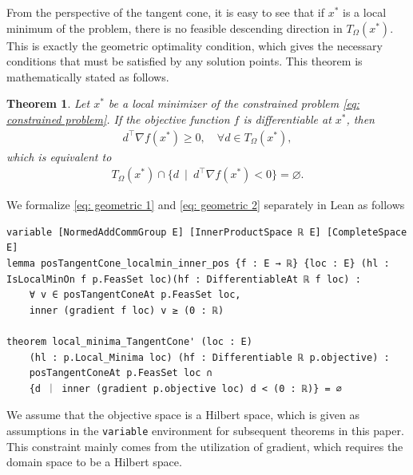 \documentclass[sn-mathphys]{JORSC-jnl}%
\theoremstyle{thmstyleone}%
\newtheorem{theorem}{Theorem}%
\theoremstyle{thmstylethree}%
\newcommand{\lean}[1]{\lstinline[language=lean, mathescape=true]{#1}}
\begin{document}
From the perspective of the tangent cone, it is easy to see that if $x^\ast$ is a local minimum of the problem, there is no feasible descending direction in $T_\Omega(x^\ast)$. This is exactly the geometric optimality condition, which gives the necessary conditions that must be satisfied by any solution points. This theorem is mathematically stated as follows.
\begin{theorem}\label{thm: geometric optimality}
    Let $x^\ast$ be a local minimizer of the constrained problem \eqref{eq: constrained problem}. If the objective function $f$ is differentiable at $x^\ast$, then
\begin{align}
d^\top \nabla f(x^\ast) \geqslant 0,\quad \forall d \in T_\Omega(x^\ast),
\label{eq: geometric 1}
\end{align}
which is equivalent to
\begin{align}
T_\Omega(x^\ast) \cap \{d\ \mid \ d^\top \nabla f(x^\ast) < 0\} = \varnothing.
\label{eq: geometric 2}
\end{align}
\end{theorem}

We formalize \eqref{eq: geometric 1} and \eqref{eq: geometric 2} separately in Lean as follows
\begin{lstlisting}
variable [NormedAddCommGroup E] [InnerProductSpace ℝ E] [CompleteSpace E]
lemma posTangentCone_localmin_inner_pos {f : E → ℝ} {loc : E} (hl : IsLocalMinOn f p.FeasSet loc)(hf : DifferentiableAt ℝ f loc) :
    ∀ v ∈ posTangentConeAt p.FeasSet loc,
    inner (gradient f loc) v ≥ (0 : ℝ)

theorem local_minima_TangentCone' (loc : E)
    (hl : p.Local_Minima loc) (hf : Differentiable ℝ p.objective) :
    posTangentConeAt p.FeasSet loc ∩
    {d ｜ inner (gradient p.objective loc) d < (0 : ℝ)} = ∅
\end{lstlisting}
We assume that the objective space is a Hilbert space, which is given as assumptions in the \lean{variable} environment for subsequent theorems in this paper. This constraint mainly comes from the utilization of gradient, which requires the domain space to be a Hilbert space. 
\end{document}
